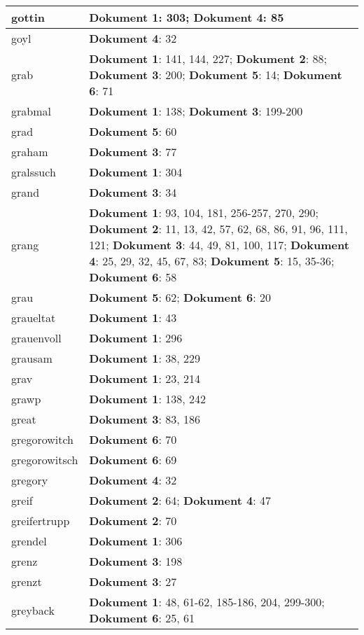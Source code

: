 \documentclass[a5paper]{article}
\begin{document}
\begin{longtable}[l]{|l|p{3in}|}
\hline
gottin & \textbf{Dokument 1}: 303; \textbf{Dokument 4}: 85 \\
\hline
goyl & \textbf{Dokument 4}: 32 \\
\hline
grab & \textbf{Dokument 1}: 141, 144, 227; \textbf{Dokument 2}: 88; \textbf{Dokument 3}: 200; \textbf{Dokument 5}: 14; \textbf{Dokument 6}: 71 \\
\hline
grabmal & \textbf{Dokument 1}: 138; \textbf{Dokument 3}: 199-200 \\
\hline
grad & \textbf{Dokument 5}: 60 \\
\hline
graham & \textbf{Dokument 3}: 77 \\
\hline
gralssuch & \textbf{Dokument 1}: 304 \\
\hline
grand & \textbf{Dokument 3}: 34 \\
\hline
grang & \textbf{Dokument 1}: 93, 104, 181, 256-257, 270, 290; \textbf{Dokument 2}: 11, 13, 42, 57, 62, 68, 86, 91, 96, 111, 121; \textbf{Dokument 3}: 44, 49, 81, 100, 117; \textbf{Dokument 4}: 25, 29, 32, 45, 67, 83; \textbf{Dokument 5}: 15, 35-36; \textbf{Dokument 6}: 58 \\
\hline
grau & \textbf{Dokument 5}: 62; \textbf{Dokument 6}: 20 \\
\hline
graueltat & \textbf{Dokument 1}: 43 \\
\hline
grauenvoll & \textbf{Dokument 1}: 296 \\
\hline
grausam & \textbf{Dokument 1}: 38, 229 \\
\hline
grav & \textbf{Dokument 1}: 23, 214 \\
\hline
grawp & \textbf{Dokument 1}: 138, 242 \\
\hline
great & \textbf{Dokument 3}: 83, 186 \\
\hline
gregorowitch & \textbf{Dokument 6}: 70 \\
\hline
gregorowitsch & \textbf{Dokument 6}: 69 \\
\hline
gregory & \textbf{Dokument 4}: 32 \\
\hline
greif & \textbf{Dokument 2}: 64; \textbf{Dokument 4}: 47 \\
\hline
greifertrupp & \textbf{Dokument 2}: 70 \\
\hline
grendel & \textbf{Dokument 1}: 306 \\
\hline
grenz & \textbf{Dokument 3}: 198 \\
\hline
grenzt & \textbf{Dokument 3}: 27 \\
\hline
greyback & \textbf{Dokument 1}: 48, 61-62, 185-186, 204, 299-300; \textbf{Dokument 6}: 25, 61 \\

\end{longtable}
\end{document}
